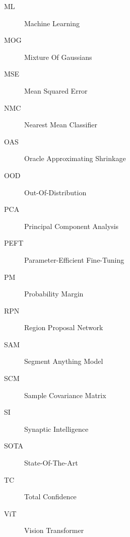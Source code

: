 \begin{description}
	\item[ML] Machine Learning
	\item[MOG] Mixture Of Gaussians
	\item[MSE] Mean Squared Error
	\item[NMC] Nearest Mean Classifier
	\item[OAS] Oracle Approximating Shrinkage
	\item[OOD] Out-Of-Distribution
	\item[PCA] Principal Component Analysis
	\item[PEFT] Parameter-Efficient Fine-Tuning
	\item[PM] Probability Margin
	\item[RPN] Region Proposal Network
	\item[SAM] Segment Anything Model
	\item[SCM] Sample Covariance Matrix
	\item[SI] Synaptic Intelligence
	\item[SOTA] State-Of-The-Art
	\item[TC] Total Confidence
	\item[ViT] Vision Transformer
\end{description}

\clearpage
